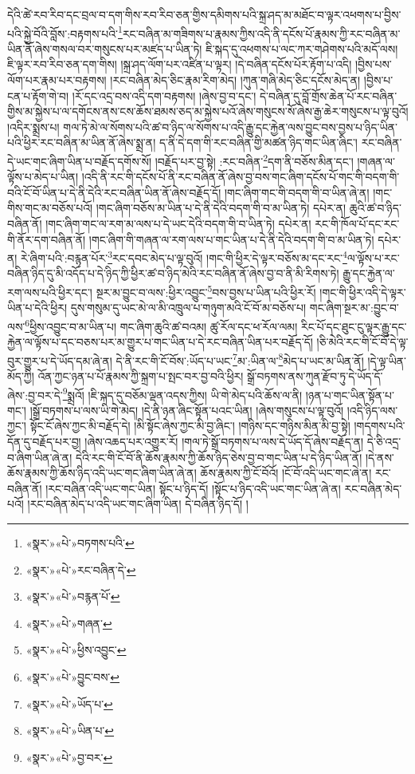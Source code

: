 དེའི་ཚེ་རབ་རིབ་དང་བྲལ་བ་དག་གིས་རབ་རིབ་ཅན་གྱིས་དམིགས་པའི་སྐྲ་ཤད་མ་མཐོང་བ་ལྟར་འཕགས་པ་བྱིས་པའི་སྐྱེ་བོའི་བློས་:བརྟགས་པའི་\footnote{«སྣར་»«པེ་»བཏགས་པའི་}རང་བཞིན་མ་གཟིགས་པ་རྣམས་ཀྱིས་འདི་ནི་དངོས་པོ་རྣམས་ཀྱི་རང་བཞིན་མ་ཡིན་ནོ་ཞེས་གསལ་བར་གསུངས་པར་མཛད་པ་ཡིན་ཏེ། ཇི་སྐད་དུ་འཕགས་པ་ལང་ཀར་གཤེགས་པའི་མདོ་ལས། ཇི་ལྟར་རབ་རིབ་ཅན་དག་གིས། །སྐྲ་ཤད་ལོག་པར་འཛིན་པ་ལྟར། །དེ་བཞིན་དངོས་པོར་རྟོག་པ་འདི། །བྱིས་པས་ལོག་པར་རྣམ་པར་བརྟགས། །རང་བཞིན་མེད་ཅིང་རྣམ་རིག་མེད། །ཀུན་གཞི་མེད་ཅིང་དངོས་མེད་ན། །བྱིས་པ་ངན་པ་རྟོག་གེ་བ། །རོ་དང་འདྲ་བས་འདི་དག་བརྟགས། །ཞེས་བྱ་བ་དང་། དེ་བཞིན་དུ་བློ་གྲོས་ཆེན་པོ་རང་བཞིན་གྱིས་མ་སྐྱེས་པ་ལ་དགོངས་ནས་ངས་ཆོས་ཐམས་ཅད་མ་སྐྱེས་པའོ་ཞེས་གསུངས་སོ་ཞེས་རྒྱ་ཆེར་གསུངས་པ་ལྟ་བུའོ། །འདིར་སྨྲས་པ། གལ་ཏེ་མེ་ལ་སོགས་པའི་ཚ་བ་ཉིད་ལ་སོགས་པ་འདི་རྒྱུ་དང་རྐྱེན་ལས་བྱུང་བས་བྱས་པ་ཉིད་ཡིན་པའི་ཕྱིར་རང་བཞིན་མ་ཡིན་ནོ་ཞེས་སྨྲ་ན། ད་ནི་དེ་དག་གི་རང་བཞིན་གྱི་མཚན་ཉིད་གང་ཡིན་ཞིང་། རང་བཞིན་དེ་ཡང་གང་ཞིག་ཡིན་པ་བརྗོད་དགོས་སོ། །བརྗོད་པར་བྱ་སྟེ། :རང་བཞིན་\footnote{«སྣར་»«པེ་»རང་བཞིན་དེ་}དག་ནི་བཅོས་མིན་དང་། །གཞན་ལ་ལྟོས་པ་མེད་པ་ཡིན། །འདི་ནི་རང་གི་དངོས་པོ་ནི་རང་བཞིན་ནོ་ཞེས་བྱ་བས་གང་ཞིག་དངོས་པོ་གང་གི་བདག་གི་བའི་ངོ་བོ་ཡིན་པ་དེ་ནི་དེའི་རང་བཞིན་ཡིན་ནོ་ཞེས་བརྗོད་དོ། །གང་ཞིག་གང་གི་བདག་གི་བ་ཡིན་ཞེ་ན། །གང་གིས་གང་མ་བཅོས་པའོ། །གང་ཞིག་བཅོས་མ་ཡིན་པ་དེ་ནི་དེའི་བདག་གི་བ་མ་ཡིན་ཏེ། དཔེར་ན། ཆུའི་ཚ་བ་ཉིད་བཞིན་ནོ། །གང་ཞིག་གང་ལ་རག་མ་ལས་པ་དེ་ཡང་དེའི་བདག་གི་བ་ཡིན་ཏེ། དཔེར་ན། རང་གི་ཁོལ་པོ་དང་རང་གི་ནོར་དག་བཞིན་ནོ། །གང་ཞིག་གི་གཞན་ལ་རག་ལས་པ་གང་ཡིན་པ་དེ་ནི་དེའི་བདག་གི་བ་མ་ཡིན་ཏེ། དཔེར་ན། རེ་ཞིག་པའི་:བརྙན་པོར་\footnote{«སྣར་»«པེ་»བརྙན་པོ་}རང་དབང་མེད་པ་ལྟ་བུའོ། །གང་གི་ཕྱིར་དེ་ལྟར་བཅོས་མ་དང་རང་\footnote{«སྣར་»«པེ་»གཞན་}ལ་ལྟོས་པ་རང་བཞིན་ཉིད་དུ་མི་འདོད་པ་དེ་ཉིད་ཀྱི་ཕྱིར་ཚ་བ་ཉིད་མེའི་རང་བཞིན་ནོ་ཞེས་བྱ་བ་ནི་མི་རིགས་ཏེ། རྒྱུ་དང་རྐྱེན་ལ་རག་ལས་པའི་ཕྱིར་དང་། སྔར་མ་བྱུང་བ་ལས་:ཕྱིར་འབྱུང་\footnote{«སྣར་»«པེ་»ཕྱིས་འབྱུང་}བས་བྱས་པ་ཡིན་པའི་ཕྱིར་རོ། །གང་གི་ཕྱིར་འདི་དེ་ལྟར་ཡིན་པ་དེའི་ཕྱིར། དུས་གསུམ་དུ་ཡང་མེ་ལ་མི་འཁྲུལ་པ་གཉུག་མའི་ངོ་བོ་མ་བཅོས་པ། གང་ཞིག་སྔར་མ་:བྱུང་བ་ལས་\footnote{«སྣར་»«པེ་»བྱུང་བས་}ཕྱིས་འབྱུང་བ་མ་ཡིན་པ། གང་ཞིག་ཆུའི་ཚ་བའམ། ཚུ་རོལ་དང་ཕ་རོལ་ལམ། རིང་པོ་དང་ཐུང་ངུ་ལྟར་རྒྱུ་དང་རྐྱེན་ལ་ལྟོས་པ་དང་བཅས་པར་མ་གྱུར་པ་གང་ཡིན་པ་དེ་རང་བཞིན་ཡིན་པར་བརྗོད་དོ། །ཅི་མེའི་རང་གི་ངོ་བོ་དེ་ལྟ་བུར་གྱུར་པ་དེ་ཡོད་དམ་ཞེ་ན། དེ་ནི་རང་གི་ངོ་བོས་:ཡོད་པ་ཡང་\footnote{«སྣར་»«པེ་»ཡོད་པ་}མ་:ཡིན་ལ་\footnote{«སྣར་»«པེ་»ཡིན་པ་}མེད་པ་ཡང་མ་ཡིན་ནོ། །དེ་ལྟ་ཡིན་མོད་ཀྱི། འོན་ཀྱང་ཉན་པ་པོ་རྣམས་ཀྱི་སྐྲག་པ་སྤང་བར་བྱ་བའི་ཕྱིར། སྒྲོ་བཏགས་ནས་ཀུན་རྫོབ་ཏུ་དེ་ཡོད་དོ་ཞེས་:བྱ་བར་དེ་\footnote{«སྣར་»«པེ་»བྱ་བར་}སྨྲའོ། །ཇི་སྐད་དུ་བཅོམ་ལྡན་འདས་ཀྱིས། ཡི་གེ་མེད་པའི་ཆོས་ལ་ནི། །ཉན་པ་གང་ཡིན་སྟོན་པ་གང་། །སྒྲོ་བཏགས་པ་ལས་ཡི་གེ་མེད། །དེ་ནི་ཉན་ཞིང་སྟོན་པའང་ཡིན། །ཞེས་གསུངས་པ་ལྟ་བུའོ། །འདི་ཉིད་ལས་ཀྱང་། སྟོང་ངོ་ཞེས་ཀྱང་མི་བརྗོད་དེ། །མི་སྟོང་ཞེས་ཀྱང་མི་བྱ་ཞིང་། །གཉིས་དང་གཉིས་མིན་མི་བྱ་སྟེ། །གདགས་པའི་དོན་དུ་བརྗོད་པར་བྱ། །ཞེས་འཆད་པར་འགྱུར་རོ། །གལ་ཏེ་སྒྲོ་བཏགས་པ་ལས་དེ་ཡོད་དོ་ཞེས་བརྗོད་ན། དེ་ཅི་འདྲ་བ་ཞིག་ཡིན་ཞེ་ན། དེའི་རང་གི་ངོ་བོ་ནི་ཆོས་རྣམས་ཀྱི་ཆོས་ཉིད་ཅེས་བྱ་བ་གང་ཡིན་པ་དེ་ཉིད་ཡིན་ནོ། །དེ་ནས་ཆོས་རྣམས་ཀྱི་ཆོས་ཉིད་འདི་ཡང་གང་ཞིག་ཡིན་ཞེ་ན། ཆོས་རྣམས་ཀྱི་ངོ་བོའོ། །ངོ་བོ་འདི་ཡང་གང་ཞེ་ན། རང་བཞིན་ནོ། །རང་བཞིན་འདི་ཡང་གང་ཡིན། སྟོང་པ་ཉིད་དོ། །སྟོང་པ་ཉིད་འདི་ཡང་གང་ཡིན་ཞེ་ན། རང་བཞིན་མེད་པའོ། །རང་བཞིན་མེད་པ་འདི་ཡང་གང་ཞིག་ཡིན། དེ་བཞིན་ཉིད་དོ། །
